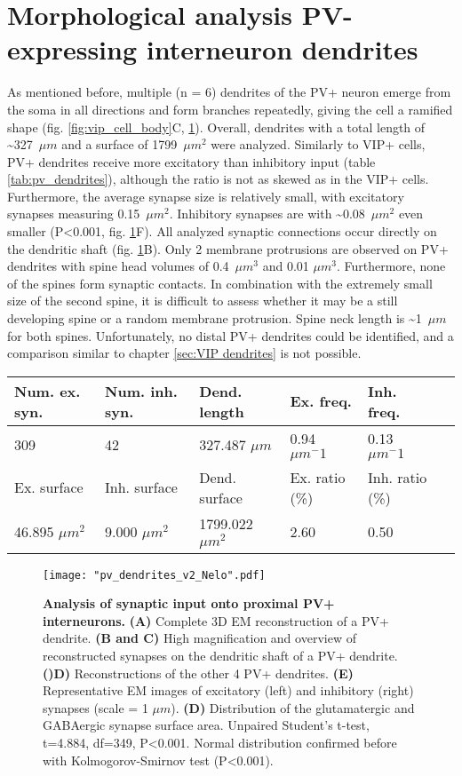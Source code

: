 \section{Morphological analysis PV-expressing interneuron dendrites}
\label{sec:PV dendrites}
As mentioned before, multiple (n = 6) dendrites of the PV+ neuron emerge from the soma in all directions and form branches repeatedly, giving the cell a ramified shape (fig. \ref{fig:vip_cell_body}C, \ref{fig:pv_dendrites}). Overall, dendrites with a total length of \textasciitilde 327~$\mu m$ and a surface of 1799~$\mu m^2$ were analyzed. Similarly to VIP+ cells, PV+ dendrites receive more excitatory than inhibitory input (table \ref{tab:pv_dendrites}), although the ratio is not as skewed as in the VIP+ cells. Furthermore, the average synapse size is relatively small, with excitatory synapses measuring 0.15~$\mu m^2$. Inhibitory synapses are with \textasciitilde 0.08~$\mu m^2$ even smaller (P<0.001, fig. \ref{fig:pv_dendrites}F). All analyzed synaptic connections occur directly on the dendritic shaft (fig. \ref{fig:pv_dendrites}B). Only 2 membrane protrusions are observed on PV+ dendrites with spine head volumes of 0.4~$\mu m^3$ and 0.01 $\mu m^3$. Furthermore, none of the spines form synaptic contacts. In combination with the extremely small size of the second spine, it is difficult to assess whether it may be a still developing spine or a random membrane protrusion. Spine neck length is \textasciitilde 1~$\mu m$ for both spines. Unfortunately, no distal PV+ dendrites could be identified, and a comparison similar to chapter \ref{sec:VIP dendrites} is not possible. \\
\label{tab:pv_dendrites}
\begin{tabular} {|l|l|l|l|l|l|}
	\hline
	Num. ex. syn. & Num. inh. syn. & Dend. length  & Ex. freq. & Inh. freq. \\
	\hline
	309 & 42 & 327.487 $\mu m$ & 0.94 $\mu m^-1$ & 0.13 $\mu m^-1$\\
	\hline
	Ex. surface & Inh. surface & Dend. surface & Ex. ratio (\%) & Inh. ratio (\%)  \\
	\hline
	46.895 $\mu m^2$ & 9.000 $\mu m^2$ & 1799.022 $\mu m^2$ & 2.60 & 0.50 \\
	\hline
\end{tabular}
\begin{figure}
	\captionsetup[figure]{indentation=0pt}
	\texttt{[image: "pv\_dendrites\_v2\_Nelo".pdf]}
	\caption[Synaptic input into PV+ interneurons.]{\textbf{Analysis of synaptic input onto proximal PV+ interneurons.} \textbf{(A)} Complete 3D EM reconstruction of a PV+ dendrite. \textbf{(B and C)} High magnification and overview of reconstructed synapses on the dendritic shaft of a PV+ dendrite. \textbf{()D)} Reconstructions of the other 4 PV+ dendrites. \textbf{(E)} Representative EM images of excitatory (left) and inhibitory (right) synapses (scale = 1 $\mu m$). \textbf{(D)} Distribution of the glutamatergic and GABAergic synapse surface area. Unpaired Student's t-test, t=4.884, df=349, P<0.001. Normal distribution confirmed before with Kolmogorov-Smirnov test (P<0.001).}
	\label{fig:pv_dendrites}
\end{figure}
